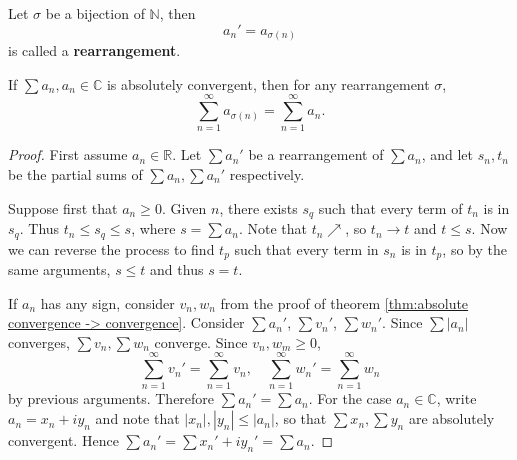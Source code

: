 \begin{definition}[Rearrangement]
    Let $ \sigma $ be a bijection of $ \mathbb{N} $, then 
    \[
        a_n'=a_{\sigma(n)}
    \]
    is called a \textbf{rearrangement}.
\end{definition}
\begin{theorem}\label{thm:absolute convergence -> rearr convergence}
    If $ \sum a_n, a_n\in \mathbb{C} $ is absolutely convergent, then for any rearrangement $ \sigma $,
    \[
        \sum_{n=1}^{\infty}a_{\sigma(n)} = \sum_{n=1}^{\infty} a_n.
    \]
\end{theorem}
\begin{proof}
    First assume $ a_n\in \mathbb{R} $. Let $ \sum a_n' $ be a rearrangement of $ \sum a_n $, and let $ s_n,t_n $ be the partial sums of $ \sum a_n,\sum a_n' $ respectively. 
    
    Suppose first that $a_n\ge 0$. Given $n$, there exists $s_q$ such that every term of $t_n$ is in $s_q$. Thus $ t_n\le s_q\le s $, where $ s = \sum a_n $. Note that $ t_n \nearrow $, so $ t_n\to t $ and $ t\le s $. Now we can reverse the process to find $t_p$ such that every term in $s_n$ is in $t_p$, so by the same arguments, $ s\le t $ and thus $ s=t $.
    
    If $ a_n $ has any sign, consider $ v_n,w_n $ from the proof of theorem \ref{thm:absolute convergence -> convergence}. Consider $ \sum a_n'$, $\sum v_n'$, $\sum w_n' $. Since $ \sum |a_n| $ converges, $ \sum v_n,\sum w_n $ converge. Since $v_n,w_m\ge 0$,
    \[
        \sum_{n=1}^{\infty} v_n' = \sum_{n=1}^{\infty} v_n,\quad\sum_{n=1}^{\infty} w_n'=\sum_{n=1}^{\infty} w_n
    \]
    by previous arguments. Therefore $ \sum a_n' = \sum a_n $. For the case $ a_n\in \mathbb{C}  $, write $ a_n = x_n+iy_n $ and note that $ |x_n|,|y_n|\le |a_n| $, so that $ \sum x_n,\sum y_n $ are absolutely convergent. Hence $ \sum a_n' = \sum x_n'+iy_n'=\sum a_n $.
\end{proof}
